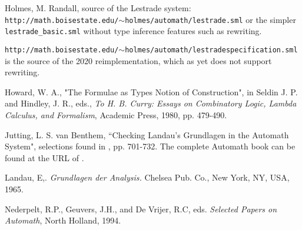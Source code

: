 \documentclass[12pt]{article}
\begin{document}
\begin{thebibliography}{99}
  Holmes, M. Randall, source of the Lestrade system:  {\tt http://math.boisestate.edu/$\sim$holmes/automath/lestrade.sml} or the simpler {\tt lestrade\_basic.sml} without type inference features such as rewriting.

{\tt http://math.boisestate.edu/$\sim$holmes/automath/lestradespecification.sml} is the source of the 2020 reimplementation, which as yet does not support rewriting.

 Howard, W. A., "The Formulae as Types Notion of Construction", in Seldin J. P. and Hindley, J. R., eds., {\em To H. B. Curry:  Essays on Combinatory Logic, Lambda Calculus, and Formalism}, Academic Press, 1980, pp. 479-490.

 Jutting, L. S. van Benthem, ``Checking Landau's Grundlagen in the Automath System", selections found in \cite{automathbook}, pp. 701-732.    The complete Automath book can be found at the URL of  \cite{freek}.

   Landau, E,. {\em Grundlagen der Analysis.\/} Chelsea Pub. Co., New
York, NY, USA, 1965.

 Nederpelt, R.P., Geuvers, J.H., and De Vrijer, R.C, eds. {\em Selected Papers on Automath}, North Holland, 1994.



\end{thebibliography}
\end{document}
